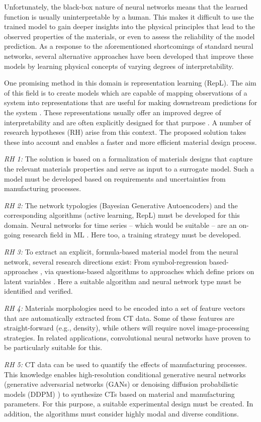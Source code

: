 Unfortunately, the black-box nature of neural networks means that the learned function is usually uninterpretable by a human. This makes it difficult to use the trained model to gain deeper insights into the physical principles that lead to the observed properties of the materials, or even to assess the reliability of the model prediction. As a response to the aforementioned shortcomings of standard neural networks, several alternative approaches have been developed that improve these models by learning physical concepts of varying degrees of interpretability. \cite{PIM, GAN, Graph}

One promising method in this domain is representation learning (RepL). The aim of this field is to create models which are capable of mapping observations of a system into representations that are useful for making downstream predictions for the system \cite{RepL}. These representations usually offer an improved degree of interpretability and are often explicitly designed for that purpose \cite{kingma:2014a, BVAE, Eureqa, AIFeynman}. A number of research hypotheses (RH) arise from this context. The proposed solution takes these into account and enables a faster and more efficient material design process.

\textit{RH 1:} The solution is based on a formalization of materials designs that capture the relevant materials properties and serve as input to a surrogate model. Such a model must be developed based on requirements and uncertainties from manufacturing processes.

\textit{RH 2:} The network typologies (Bayesian Generative Autoencoders) and the corresponding algorithms (active learning, RepL) must be developed for this domain. Neural networks for time series -- which would be suitable -- are an on-going research field in ML \cite{HEWAMALAGE2021388,8489399}. Here too, a training strategy must be developed.

\textit{RH 3:} To extract an explicit, formula-based material model from the neural network, several research directions exist: From symbol-regression based-approaches \cite{doi:10.1073/pnas.1517384113}, via questions-based algorithms \cite{PhysRevLett.124.010508} to approaches which define priors on latent variables \cite{kingma:2014a}. Here a suitable algorithm and neural network type must be identified and verified.

\textit{RH 4:} Materials morphologies need to be encoded into a set of feature vectors that are automatically extracted from CT data. Some of these features are straight-forward (e.g., density), while others will require novel image-processing strategies. In related applications, convolutional neural networks have proven to be particularly suitable for this.

\textit{RH 5:} CT data can be used to quantify the effects of manufacturing processes. This knowledge enables high-resolution conditional generative neural networks (generative adversarial networks (GANs) \cite{goodfellow2014generative} or denoising diffusion probabilistic models (DDPM) \cite{ho2020denoising}) to synthesize CTs based on material and manufacturing parameters. For this purpose, a suitable experimental design must be created. In addition, the algorithms must consider highly modal and diverse conditions.
